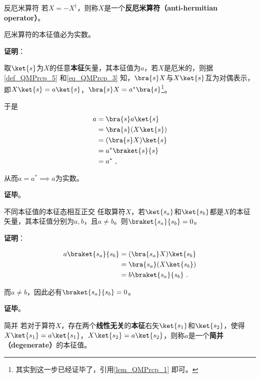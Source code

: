 \begin{definition}{反厄米算符}\label{def_QMPrcp_19}
若$X=-X^\dagger$，则称$X$是一个\textbf{反厄米算符（anti-hermitian operator）}。
\end{definition}

\begin{theorem}{}\label{the_QMPrcp_2}
厄米算符的本征值必为实数。
\end{theorem}

\textbf{证明}：

取$\ket{s}$为$X$的任意\textbf{本征}矢量，其本征值为$a$，若$X$是厄米的，则据\autoref{def_QMPrcp_5} 和\autoref{eq_QMPrcp_3} 知，$\bra{s}X$与$X\ket{s}$互为对偶表示，即$X\ket{s}=a\ket{s}$，$\bra{s}X=a^*\bra{s}$\footnote{其实到这一步已经证毕了，引用\autoref{lem_QMPrcp_1} 即可。}。

于是
\begin{equation}\label{eq_QMPrcp_5}
\begin{aligned}
a&=\bra{s}a\ket{s}\\
&=\bra{s}(X\ket{s})\\
&=(\bra{s}X)\ket{s}\\
&=a^*\braket{s}{s}\\
&=a^*~,
\end{aligned}
\end{equation}

从而$a=a^*\implies a$为实数。

\textbf{证毕}。

\begin{theorem}{不同本征值的本征态相互正交}\label{the_QMPrcp_3}
任取算符$X$，若$\ket{s_a}$和$\ket{s_b}$都是$X$的本征矢量，其本征值分别为$a,b$，且$a\neq b$。则$\braket{s_a}{s_b}=0$。
\end{theorem}

\textbf{证明}：

\begin{equation}
\begin{aligned}
a\braket{s_a}{s_b}&=(\bra{s_a}X)\ket{s_b}\\
&=\bra{s_a}(X\ket{s_b})\\
&=b\braket{s_a}{s_b}~.
\end{aligned}
\end{equation}

而$a\neq b$，因此必有$\braket{s_a}{s_b}=0$。

\textbf{证毕}。

\begin{definition}{简并}\label{def_QMPrcp_16}
若对于算符$X$，存在两个\textbf{线性无关}的\textbf{本征}右矢$\ket{s_1}$和$\ket{s_2}$，使得$X\ket{s_1}=a\ket{s_1}$，$X\ket{s_2}=a\ket{s_2}$，则称$a$是一个\textbf{简并（degenerate）}的本征值。
\end{definition}



